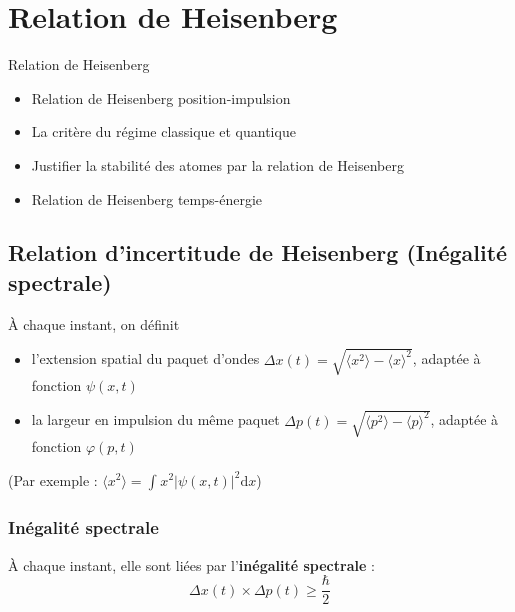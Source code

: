 \chapter{Relation de Heisenberg} %
\label{chap:Relation de Heisenberg}

\begin{tcolorbox}
Relation de Heisenberg

\begin{itemize}

    \item Relation de Heisenberg position-impulsion 
    \item La critère du régime classique et quantique 
    \item Justifier la stabilité des atomes par la relation de Heisenberg 
    \item Relation de Heisenberg temps-énergie

\end{itemize}
\end{tcolorbox}

\section{Relation d'incertitude de Heisenberg (Inégalité spectrale)} %
\label{sec:Relation d'incertitude de Heisenberg (Inégalité spectrale)}

À chaque instant, on définit 
\begin{itemize}

    \item l'extension spatial du paquet d'ondes $\Delta x (t) = \sqrt{ \langle x ^{2} \rangle - \langle x \rangle ^{2}}$, adaptée à fonction $\psi(x,t)$
    \item la largeur en impulsion du même paquet $\Delta p (t) = \sqrt{ \langle p ^{2} \rangle - \langle p \rangle ^{2}}$, adaptée à fonction $\varphi(p,t)$

\end{itemize}

(Par exemple : $\langle x ^{2} \rangle = \int_{}^{} x ^{2} | \psi(x,t) | ^{2} \mathrm{d}x$)

\subsection{Inégalité spectrale} %

À chaque instant, elle sont liées par l'\textbf{inégalité spectrale} : 
\begin{equation}
  \boxed{\Delta x(t) \times \Delta p(t) \ge \frac{\hbar}{2} }
\end{equation}

